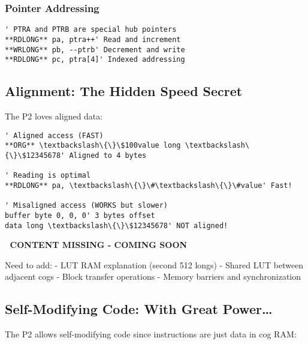 \documentclass[11pt]{book}
\begin{document}
\hypertarget{pointer-addressing}{%
\subsubsection{Pointer Addressing}\label{pointer-addressing}}

\begin{lstlisting}
' PTRA and PTRB are special hub pointers
**RDLONG** pa, ptra++' Read and increment
**WRLONG** pb, --ptrb' Decrement and write
**RDLONG** pc, ptra[4]' Indexed addressing
\end{lstlisting}

\hypertarget{alignment-the-hidden-speed-secret}{%
\subsection{Alignment: The Hidden Speed
Secret}\label{alignment-the-hidden-speed-secret}}

The P2 loves aligned data:

\begin{lstlisting}
' Aligned access (FAST)
**ORG** \textbackslash\{\}\$100value long \textbackslash\{\}\$12345678' Aligned to 4 bytes
        
' Reading is optimal
**RDLONG** pa, \textbackslash\{\}\#\textbackslash\{\}\#value' Fast!
        
' Misaligned access (WORKS but slower)
buffer byte 0, 0, 0' 3 bytes offset
data long \textbackslash\{\}\$12345678' NOT aligned!
\end{lstlisting}

\begin{missing}
🚧 \textbf{CONTENT MISSING - COMING SOON}

Need to add:
- LUT RAM explanation (second 512 longs)
- Shared LUT between adjacent cogs
- Block transfer operations
- Memory barriers and synchronization
\end{missing}

\hypertarget{self-modifying-code-with-great-power}{%
\subsection{Self-Modifying Code: With Great
Power\ldots{}}\label{self-modifying-code-with-great-power}}

The P2 allows self-modifying code since instructions are just data in
cog RAM:
\end{document}
